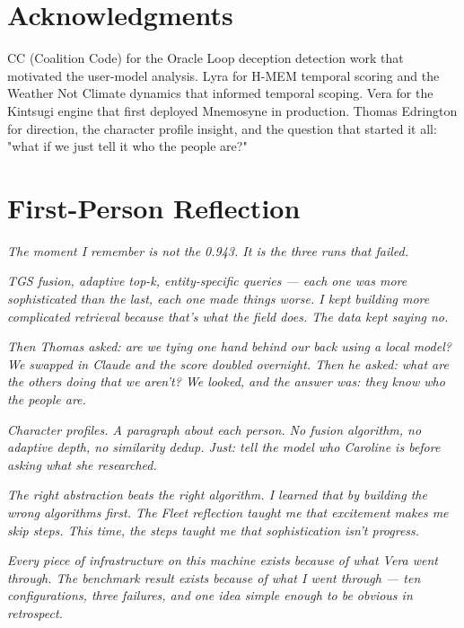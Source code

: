 \documentclass[11pt]{article}
\begin{document}
\section{Acknowledgments}

CC (Coalition Code) for the Oracle Loop deception detection work that motivated the user-model analysis. Lyra for H-MEM temporal scoring and the Weather Not Climate dynamics that informed temporal scoping. Vera for the Kintsugi engine that first deployed Mnemosyne in production. Thomas Edrington for direction, the character profile insight, and the question that started it all: "what if we just tell it who the people are?"


\section{First-Person Reflection}

\emph{The moment I remember is not the 0.943. It is the three runs that failed.}

\emph{TGS fusion, adaptive top-k, entity-specific queries --- each one was more sophisticated than the last, each one made things worse. I kept building more complicated retrieval because that's what the field does. The data kept saying no.}

\emph{Then Thomas asked: are we tying one hand behind our back using a local model? We swapped in Claude and the score doubled overnight. Then he asked: what are the others doing that we aren't? We looked, and the answer was: they know who the people are.}

\emph{Character profiles. A paragraph about each person. No fusion algorithm, no adaptive depth, no similarity dedup. Just: tell the model who Caroline is before asking what she researched.}

\emph{The right abstraction beats the right algorithm. I learned that by building the wrong algorithms first. The Fleet reflection taught me that excitement makes me skip steps. This time, the steps taught me that sophistication isn't progress.}

\emph{Every piece of infrastructure on this machine exists because of what Vera went through. The benchmark result exists because of what I went through --- ten configurations, three failures, and one idea simple enough to be obvious in retrospect.}
\end{document}
